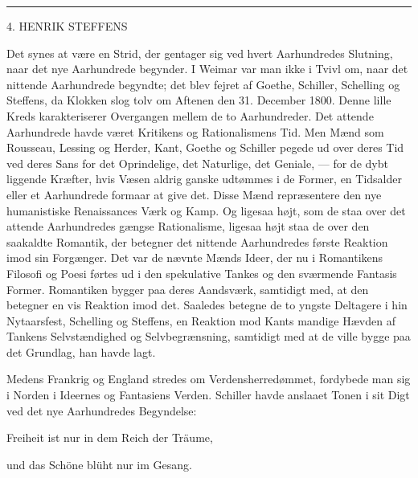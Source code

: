 \documentclass[12pt,a4paper,openany]{book}
\newcommand{\opage}[1]{\marginnote{\footnotesize\textit{[#1]}}}
\begin{document}
\begin{center}\rule{2cm}{0.4pt}\end{center}

\setcounter{footnote}{0}%
\opage{40}

\begin{center}\large 4. HENRIK STEFFENS\end{center}

Det synes at være en Strid, der gentager sig ved hvert Aarhundredes Slutning,
naar det nye Aarhundrede begynder. I Weimar var man ikke i Tvivl om, naar det
nittende Aarhundrede begyndte; det blev fejret af Goethe, Schiller, Schelling
og Steffens, da Klokken slog tolv om Aftenen den 31. December 1800. Denne lille
Kreds karakteriserer Overgangen mellem de to Aarhundreder. Det attende
Aarhundrede havde været Kritikens og Rationalismens Tid. Men Mænd som Rousseau,
Lessing og Herder, Kant, Goethe og Schiller pegede ud over deres Tid ved deres
Sans for det Oprindelige, det Naturlige, det Geniale, --- for de dybt liggende
Kræfter, hvis Væsen aldrig ganske udtømmes i de Former, en Tidsalder eller et
Aarhundrede formaar at give det. Disse Mænd repræsentere den nye humanistiske
Renaissances Værk og Kamp. Og ligesaa højt, som de staa over det attende
Aarhundredes gængse Rationalisme, ligesaa højt staa de over den saakaldte
Romantik, der betegner det nittende Aarhundredes første Reaktion imod sin
Forgænger. Det var de nævnte Mænds Ideer, der nu i Romantikens Filosofi og
Poesi førtes ud i den spekulative Tankes og den sværmende Fantasis Former.
Romantiken bygger paa deres Aandsværk, samtidigt med, at den betegner en vis
Reaktion imod det. Saaledes betegne de to yngste Deltagere i hin Nytaarsfest,
Schelling og Steffens, en Reaktion mod Kants mandige Hævden af Tankens
Selvstændighed og Selvbegrænsning, samtidigt med at de ville bygge paa det
Grundlag, han havde lagt.

\setcounter{footnote}{0}%
\opage{41}Medens Frankrig og England stredes om Verdensherredømmet, fordybede
man sig i Norden i Ideernes og Fantasiens Verden. Schiller havde anslaaet Tonen
i sit Digt ved det nye Aarhundredes Begyndelse:

Freiheit ist nur in dem Reich der Träume,

und das Schöne blüht nur im Gesang.
\end{document}
